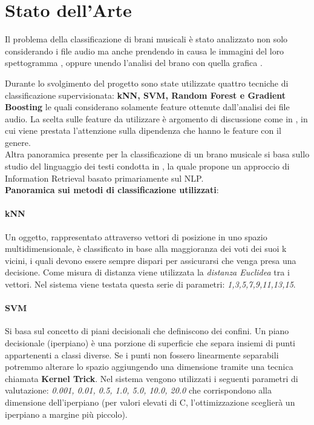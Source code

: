 \documentclass[%
 reprint,
 amsmath,amssymb,
 aps,
 article,
]{revtex4-1}
\begin{document}
\section{\label{sec:level1}Stato dell'Arte}

Il problema della classificazione di brani musicali è stato analizzato non solo considerando i file audio ma anche prendendo in causa le immagini del loro spettogramma \cite {spettogrammaClassifier}, oppure unendo l'analisi del brano con quella grafica \cite {spettoAudioClassifier}.


Durante lo svolgimento del progetto sono state utilizzate quattro tecniche di classificazione supervisionata:  \textbf{kNN, SVM, Random Forest e Gradient Boosting} le quali considerano solamente feature ottenute dall'analisi dei file audio. La scelta sulle feature da utilizzare è argomento di discussione come in \cite {featBeat}, in cui viene prestata l'attenzione sulla dipendenza che hanno le feature con il genere. \\

Altra panoramica presente per la classificazione di un brano musicale si basa sullo studio del linguaggio dei testi condotta in \cite {lyrics}, la quale propone un approccio di Information Retrieval basato primariamente sul NLP.\\

\textbf{Panoramica sui metodi di classificazione utilizzati}:\\

\paragraph{kNN}
Un oggetto, rappresentato attraverso vettori di posizione in uno spazio multidimensionale, è classificato in base alla maggioranza dei voti dei suoi k vicini, i quali devono essere sempre dispari per assicurarsi che venga presa una decisione. Come misura di distanza viene utilizzata la \textit{distanza Euclidea} tra i vettori. Nel sistema viene testata questa serie di parametri: \textit{1,3,5,7,9,11,13,15}. 

\paragraph{SVM}
Si basa sul concetto di piani decisionali che definiscono dei confini. Un piano decisionale (iperpiano) è una porzione di superficie che separa insiemi di punti appartenenti a classi diverse. Se i punti non fossero linearmente separabili potremmo alterare lo spazio aggiungendo una dimensione tramite una tecnica chiamata  \textbf{Kernel Trick}. Nel sistema vengono utilizzati i seguenti parametri di valutazione: \textit{0.001, 0.01, 0.5, 1.0, 5.0, 10.0, 20.0} che corrispondono alla dimensione dell'iperpiano (per valori elevati di C, l'ottimizzazione sceglierà un iperpiano a margine più piccolo).
\end{document}

